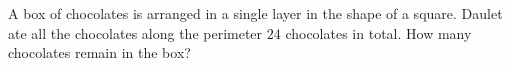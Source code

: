 A box of chocolates is arranged in a single layer in the shape of a square. Daulet ate all the chocolates along the perimeter $24$ chocolates in total. How many chocolates remain in the box?
